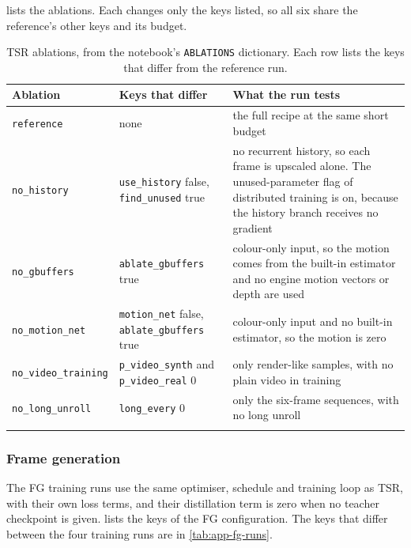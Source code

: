  lists the ablations. Each changes only the keys listed, so all six share the reference's other keys and its budget.

\begin{table}[!htbp]
\caption{TSR ablations, from the notebook's \texttt{ABLATIONS} dictionary. Each row lists the keys that differ from the reference run.}\label{tab:app-tsr-abl}
\footnotesize
\begin{tabular*}{\textwidth}{@{\extracolsep\fill}lp{}p{}}
\toprule
Ablation & Keys that differ & What the run tests \\
\midrule
\texttt{reference} & none & the full recipe at the same short budget \\
\texttt{no\_history} & \texttt{use\_history} false, \texttt{find\_unused} true & no recurrent history, so each frame is upscaled alone. The unused-parameter flag of distributed training is on, because the history branch receives no gradient \\
\texttt{no\_gbuffers} & \texttt{ablate\_gbuffers} true & colour-only input, so the motion comes from the built-in estimator and no engine motion vectors or depth are used \\
\texttt{no\_motion\_net} & \texttt{motion\_net} false, \texttt{ablate\_gbuffers} true & colour-only input and no built-in estimator, so the motion is zero \\
\texttt{no\_video\_training} & \texttt{p\_video\_synth} and \texttt{p\_video\_real} 0 & only render-like samples, with no plain video in training \\
\texttt{no\_long\_unroll} & \texttt{long\_every} 0 & only the six-frame sequences, with no long unroll \\
\botrule
\end{tabular*}
\end{table}

\subsubsection{Frame generation}\label{sec:app-cfg-fg}

The FG training runs use the same optimiser, schedule and training loop as TSR, with their own loss terms, and their distillation term is zero when no teacher checkpoint is given.  lists the keys of the FG configuration. The keys that differ between the four training runs are in \cref{tab:app-fg-runs}.

